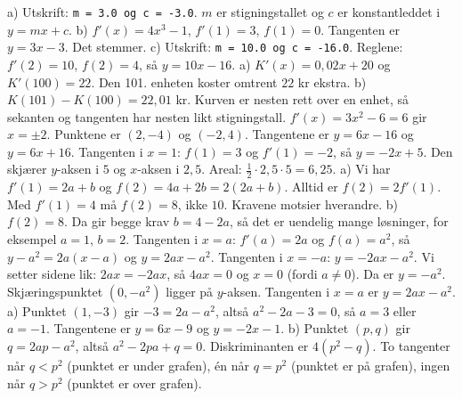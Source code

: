  a) Utskrift: \texttt{m = 3.0 og c = -3.0}. $m$ er stigningstallet og $c$ er konstantleddet i $y = mx + c$.
b) $f'(x) = 4x^3 - 1$, $f'(1) = 3$, $f(1) = 0$. Tangenten er $y = 3x - 3$. Det stemmer.
c) Utskrift: \texttt{m = 10.0 og c = -16.0}. Reglene: $f'(2) = 10$, $f(2) = 4$, så $y = 10x - 16$.
 a) $K'(x) = 0,02x + 20$ og $K'(100) = 22$. Den 101. enheten koster omtrent $22$ kr ekstra.
b) $K(101) - K(100) = 22,01$ kr. Kurven er nesten rett over en enhet, så sekanten og tangenten har nesten likt stigningstall.
 $f'(x) = 3x^2 - 6 = 6$ gir $x = \pm 2$. Punktene er $(2, -4)$ og $(-2, 4)$. Tangentene er $y = 6x - 16$ og $y = 6x + 16$.
 Tangenten i $x = 1$: $f(1) = 3$ og $f'(1) = -2$, så $y = -2x + 5$. Den skjærer $y$-aksen i $5$ og $x$-aksen i $2,5$. Areal: $\frac{1}{2}\cdot 2,5 \cdot 5 = 6,25$.
 a) Vi har $f'(1) = 2a + b$ og $f(2) = 4a + 2b = 2(2a + b)$. Alltid er $f(2) = 2f'(1)$. Med $f'(1) = 4$ må $f(2) = 8$, ikke $10$. Kravene motsier hverandre.
b) $f(2) = 8$. Da gir begge krav $b = 4 - 2a$, så det er uendelig mange løsninger, for eksempel $a = 1$, $b = 2$.
 Tangenten i $x = a$: $f'(a) = 2a$ og $f(a) = a^2$, så $y - a^2 = 2a(x - a)$ og $y = 2ax - a^2$.
Tangenten i $x = -a$: $y = -2ax - a^2$. Vi setter sidene lik: $2ax = -2ax$, så $4ax = 0$ og $x = 0$ (fordi $a \neq 0$).
Da er $y = -a^2$. Skjæringspunktet $(0, -a^2)$ ligger på $y$-aksen.
 Tangenten i $x = a$ er $y = 2ax - a^2$.
a) Punktet $(1, -3)$ gir $-3 = 2a - a^2$, altså $a^2 - 2a - 3 = 0$, så $a = 3$ eller $a = -1$. Tangentene er $y = 6x - 9$ og $y = -2x - 1$.
b) Punktet $(p, q)$ gir $q = 2ap - a^2$, altså $a^2 - 2pa + q = 0$. Diskriminanten er $4(p^2 - q)$. To tangenter når $q < p^2$ (punktet er under grafen), én når $q = p^2$ (punktet er på grafen), ingen når $q > p^2$ (punktet er over grafen).
